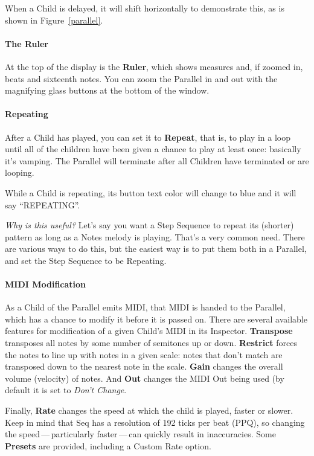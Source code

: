 \documentclass[twoside,10pt]{article}
\begin{document}
When a Child is delayed, it will shift horizontally to demonstrate this, as is shown in Figure~\ref{parallel}.

\paragraph{The Ruler}
At the top of the display is the {\bf Ruler}, which shows measures and, if zoomed in, beats and sixteenth notes. 
You can zoom the Parallel in and out with the magnifying glass buttons at the bottom of the window.


\paragraph{Repeating}

After a Child has played, you can set it to {\bf Repeat}, that is, to play in a loop until all of the children have been given a chance to play at least once: basically it's vamping.  The Parallel will terminate after all Children have terminated or are looping.

While a Child is repeating, its button text color will change to blue and it will say ``REPEATING''.

{\it Why is this useful?}  Let's say you want a Step Sequence to repeat its (shorter) pattern as long as a Notes melody is playing.  That's a very common need.  There are various ways to do this, but the easiest way is to put them both in a Parallel, and set the Step Sequence to be Repeating. 

\paragraph{MIDI Modification}

As a Child of the Parallel emits MIDI, that MIDI is handed to the Parallel, which has a chance to modify it before it is passed on.  There are several available features for modification of a given Child's MIDI in its Inspector.  {\bf Transpose} transposes all notes by some number of semitones up or down.  {\bf Restrict} forces the notes to line up with notes in a given scale: notes that don't match are transposed down to the nearest note in the scale.  {\bf Gain} changes the overall volume (velocity) of notes.  And {\bf Out} changes the MIDI Out being used (by default it is set to {\it Don't Change}.

Finally, {\bf Rate} changes the speed at which the child is played, faster or slower.  Keep in mind that Seq has a resolution of 192 ticks per beat (PPQ), so changing the speed\,---\,particularly faster\,---\,can quickly result in inaccuracies.    Some {\bf Presets} are provided, including a Custom Rate option.
\end{document}
